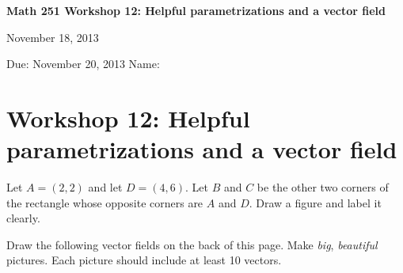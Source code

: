 \documentclass[12pt]{exam}
\theoremstyle{definition}
\begin{document}
\noindent
\textbf{{\large Math 251 \hfill Workshop 12: Helpful parametrizations and a vector field}}

\noindent
November 18, 2013 

\noindent
Due: November 20, 2013 \hfill Name: \underline{\hspace{3in}} 

\noindent

\section{Workshop 12: Helpful parametrizations and a vector field}

\begin{questions}

\question Let $A = (2,2)$ and let $D = (4,6)$. Let $B$ and $C$ be the other two corners of the rectangle whose opposite corners are $A$ and $D$. Draw a figure and label it clearly.



\question Draw the following vector fields on the back of this page. Make \emph{big}, \emph{beautiful} pictures. Each picture should include at least 10 vectors.

\end{questions}
\end{document}
